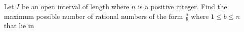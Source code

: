 Let $I$ be an open interval of length  where $n$ is a positive integer. Find the maximum possible number of rational numbers of the form $\frac{a}{b}$ where $1 \le b \le n$ that lie in 